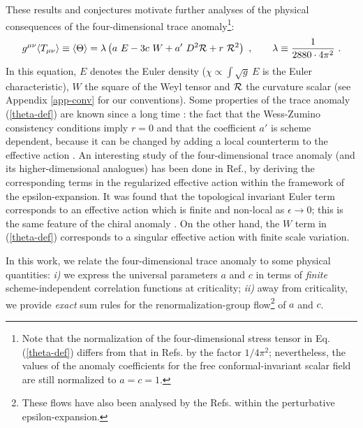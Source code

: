 \documentclass[11pt]{article}
\newcommand{\beq}{\begin{equation}}
\newcommand{\eeq}{\end{equation}}
\def\eps{\epsilon}
\def\bra{\langle}
\def\ket{\rangle}
\begin{document}
These results and conjectures motivate further analyses of the physical
consequences of the four-dimensional trace anomaly\footnote{ 
Note that the normalization of the four-dimensional
stress tensor in Eq.(\ref{theta-def}) 
differs from that in Refs.\cite{cfl}\cite{ad} by the factor
$1/4\pi^2$; nevertheless, the values of the anomaly coefficients 
for the free conformal-invariant scalar field are still normalized to 
$a=c=1$.}:
\beq\label{theta-def} 
g^{\mu\nu} \bra T_{\mu\nu} \ket \equiv 
\bra \Theta \ket = \lambda \left(
a\ E -3c\ W +a'\ D^2 {\cal R}+ r\ {\cal R}^2 \right)\ , \qquad
\lambda\equiv \frac{1}{2880\cdot 4\pi^2}\ .
\eeq  
In this equation, $E$ denotes the Euler density 
($\chi\propto\int \sqrt{g}\ E$ is the
Euler characteristic), $W$ the square of the Weyl tensor and ${\cal R}$  the 
curvature scalar (see Appendix \ref{app-conv} for our conventions). 
Some properties of the trace anomaly (\ref{theta-def}) are known  
since a long time \cite{chi-book}\cite{duff}: the fact that the  
Wess-Zumino consistency conditions imply $r=0$ \cite{pbb}\cite{cc} and 
that the coefficient $a'$ is scheme dependent, because it can be changed 
by adding a local counterterm to the effective action \cite{duff}. 
An interesting study of the four-dimensional trace anomaly 
(and its higher-dimensional analogues) has been done in Ref.\cite{ds}, 
by deriving the corresponding terms in the regularized effective action
within the framework of the epsilon-expansion.
It was found that the topological invariant Euler term
corresponds to an effective action which is finite and 
non-local as $\eps\to 0$; this is the same feature of the chiral anomaly 
\cite{chi-book}.  
On the other hand, the $W$ term in (\ref{theta-def}) 
corresponds to a singular effective action with 
finite scale variation.
 
In this work, we relate the four-dimensional trace anomaly to
some physical quantities:
{\it i)} we express the universal parameters $a$ and $c$ in 
terms of {\it finite} scheme-independent correlation functions 
at criticality; {\it ii)} away from criticality, we provide
{\it exact} sum rules for the renormalization-group flow\footnote{
These flows have also been analysed by the Refs.\cite{jo}\cite{ath} 
within the perturbative epsilon-expansion.}  
of $a$ and $c$.
\end{document}
